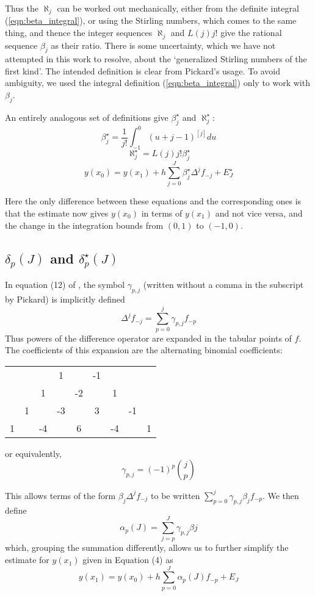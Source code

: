 \documentclass{article}
\begin{document}
Thus the $\aleph_j$ can be worked out mechanically, either from the definite integral (\ref{eqn:beta_integral}), or using the Stirling numbers, which comes to the same thing, and thence the integer sequences $\aleph_j$ and $L(j)j!$ give the rational sequence $\beta_j$ as their ratio.
There is some uncertainty, which we have not attempted in this work to resolve, about the `generalized Stirling numbers of the first kind'. The intended definition is clear from Pickard's usage. To avoid ambiguity, we used the integral definition (\ref{eqn:beta_integral}) only to work with $\beta_j$.

An entirely analogous set of definitions give $\beta^{\star}_j$ and $\aleph^{\star}_j$:
\[ \beta^{\star}_j = \frac{1}{j!}\int_{-1}^0 (u + j - 1)^{[j]} du \]
\[ \aleph^{\star}_j = L(j)j!\beta^{\star}_j \]
\[ y(x_0) = y(x_1) + h\sum_{j=0}^{J} \beta^{\star}_j \Delta^{j}f_{-j} + E^{\star}_{J} \]

Here the only difference between these equations and the corresponding ones is that the estimate now gives $y(x_0)$ in terms of $y(x_1)$ and not vice versa, and the change in the integration bounds from $(0, 1)$ to $(-1, 0)$.

\subsection{$\delta_p(J)$ and $\delta^{\star}_p(J)$}
In equation (12) of \cite{pickard}, the symbol $\gamma_{p,j}$ (written without a comma in the subscript by Pickard) is implicitly defined
\[ \Delta^{j}f_{-j}  = \sum_{p=0}^{j} \gamma_{p,j}f_{-p} \]
Thus powers of the difference operator are expanded in the tabular points of $f$.
The coefficients of this expansion are the alternating binomial coefficients:

\begin{center}
\begin{tabular}{ccccccccc}
&&&1&&-1&&&\\
&&1&&-2&&1&&\\
&1&&-3&&3&&-1&\\
1&&-4&&6&&-4&&1\\
\end{tabular}
\end{center}
or equivalently,
\[ \gamma_{p, j} = (-1)^{p} {j \choose p} \]

This allows terms of the form $\beta_j \Delta^{j}f_{-j}$ to be written $\sum_{p=0}^{j} \gamma_{p, j} \beta_{j} f_{-p}$.
We then define 
\[ \alpha_p(J) = \sum_{j=p}^{J} \gamma_{p, j} \beta{j} \]
which, grouping the summation differently, allows us to further simplify the estimate for $y(x_1)$ given in Equation (4) as
\[ y(x_1) = y(x_0) + h\sum_{p=0}^{J} \alpha_{p}(J)f_{-p} + E_{J} \]
\end{document}
